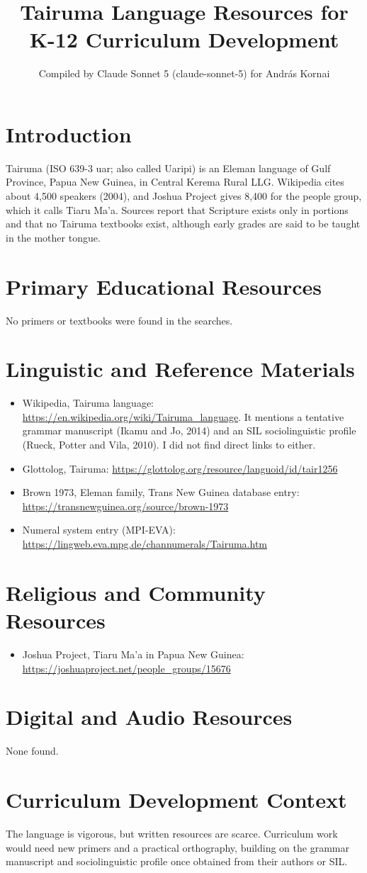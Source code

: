 \documentclass[12pt]{article}
\title{Tairuma Language Resources for K-12 Curriculum Development}
\author{Compiled by Claude Sonnet 5 (claude-sonnet-5) for Andr\'as Kornai}
\date{}
\begin{document}
\maketitle
\section{Introduction}
Tairuma (ISO 639-3 uar; also called Uaripi) is an Eleman language of Gulf Province, Papua New Guinea, in Central Kerema Rural LLG. Wikipedia cites about 4,500 speakers (2004), and Joshua Project gives 8,400 for the people group, which it calls Tiaru Ma'a. Sources report that Scripture exists only in portions and that no Tairuma textbooks exist, although early grades are said to be taught in the mother tongue.
\section{Primary Educational Resources}
No primers or textbooks were found in the searches.
\section{Linguistic and Reference Materials}
\begin{itemize}
\item Wikipedia, Tairuma language: \url{https://en.wikipedia.org/wiki/Tairuma_language}. It mentions a tentative grammar manuscript (Ikamu and Jo, 2014) and an SIL sociolinguistic profile (Rueck, Potter and Vila, 2010). I did not find direct links to either.
\item Glottolog, Tairuma: \url{https://glottolog.org/resource/languoid/id/tair1256}
\item Brown 1973, Eleman family, Trans New Guinea database entry: \url{https://transnewguinea.org/source/brown-1973}
\item Numeral system entry (MPI-EVA): \url{https://lingweb.eva.mpg.de/channumerals/Tairuma.htm}
\end{itemize}
\section{Religious and Community Resources}
\begin{itemize}
\item Joshua Project, Tiaru Ma'a in Papua New Guinea: \url{https://joshuaproject.net/people_groups/15676}
\end{itemize}
\section{Digital and Audio Resources}
None found.
\section{Curriculum Development Context}
The language is vigorous, but written resources are scarce. Curriculum work would need new primers and a practical orthography, building on the grammar manuscript and sociolinguistic profile once obtained from their authors or SIL.
\end{document}
